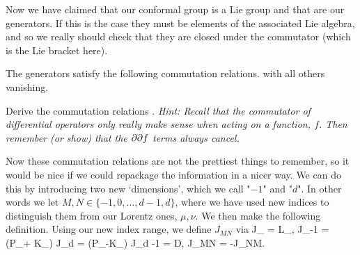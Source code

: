 Now we have claimed that our conformal group is a Lie group and that  are our generators. If this is the case they must be elements of the associated Lie algebra, and so we really should check that they are closed under the commutator (which is the Lie bracket here). 

\bp 
    The generators  satisfy the following commutation relations. 
    \noindent with all others vanishing.
\ep 


\bbox 
    Derive the commutation relations . \textit{Hint: Recall that the commutator of differential operators only really make sense when acting on a function, $f$. Then remember (or show) that the $\partial \partial f$ terms always cancel.}
\ebox 

Now these commutation relations are not the prettiest things to remember, so it would be nice if we could repackage the information in a nicer way. We can do this by introducing two new `dimensions', which we call "$-1$" and "$d$". In other words we let $M, N \in \{ -1 , 0, ... , d-1 , d\}$, where we have used new indices to distinguish them from our Lorentz ones, $\mu,\nu$. We then make the following definition.
\bd
    Using our new index range, we define $J_{MN}$ via
    \be
    J_{\mu \nu} = L_{\mu \nu}, \quad J_{-1 \mu} =  (P_\mu + K_\mu) \quad J_{d \mu}  =  (P_\mu -K_\mu) \quad J_{d -1} = D, \quad J_{MN} = -J_{NM}.
    \ee
\ed 

